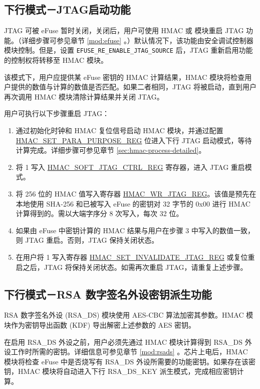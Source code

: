 \documentclass[main\_\_CN.tex]{subfiles}
\begin{document}
\subsection{下行模式－JTAG启动功能}

JTAG 可被 eFuse 暂时关闭，关闭后，用户可使用 HMAC 或 \textit{} 模块重启 JTAG 功能。（详细步骤可参见章节 \ref{mod:efuse} \textit{}。）默认情况下，该功能由安全调试控制器模块控制。但是，设置 \texttt{EFUSE\_RE\_ENABLE\_JTAG\_SOURCE} 后，JTAG 重新启用功能的控制权将转移至 HMAC 模块。

该模式下，用户应提供某 eFuse 密钥的 HMAC 计算结果，HMAC 模块将检查用户提供的数值与计算的数值是否匹配。如果二者相同，JTAG 将被启动，直到用户再次调用 HMAC 模块清除计算结果并关闭 JTAG。

用户可执行以下步骤重启 JTAG：

\begin{enumerate}
    \item 通过初始化时钟和 HMAC 复位信号启动 HMAC 模块，并通过配置 \hyperref[regdesc:HMACSETPARAPURPOSEREG]{HMAC\_SET\_PARA\_PURPOSE\_REG} 位进入下行 JTAG 启动模式，等待计算完成。详细步骤可参见章节 \ref{sec:hmac-process-detailed}。
    \item 将 1 写入 \hyperref[regdesc:HMACSOFTJTAGCTRLREG]{HMAC\_SOFT\_JTAG\_CTRL\_REG} 寄存器，进入 JTAG 重启模式。
    \item 将 256 位的 HMAC 值写入寄存器 \hyperref[regdesc:HMACWRJTAGREG]{HMAC\_WR\_JTAG\_REG}。该值是预先在本地使用 SHA-256 和已被写入 eFuse 的密钥对 32 字节的 0x00 进行 HMAC 计算得到的。需以大端字序分 8 次写入，每次 32 位。
    \item 如果由 eFuse 中密钥计算的 HMAC 结果与用户在步骤 3 中写入的数值一致，则 JTAG 重启。否则，JTAG 保持关闭状态。
    \item 在用户将 1 写入寄存器 \hyperref[regdesc:HMACSETINVALIDATEJTAGREG]{HMAC\_SET\_INVALIDATE\_JTAG\_REG} 或复位重启之后，JTAG 将保持关闭状态。如需再次重启 JTAG，请重复上述步骤。
    \end{enumerate}

\subsection{下行模式－RSA 数字签名外设密钥派生功能}

RSA 数字签名外设 (RSA\_DS) 模块使用 AES-CBC 算法加密其参数。HMAC 模块作为密钥导出函数 (KDF) 导出解密上述参数的 AES 密钥。

在启用 RSA\_DS 外设之前，用户必须先通过 HMAC 模块计算得到 RSA\_DS 外设工作时所需的密钥。详细信息可参见章节 \ref{mod:rsads} \textit{}。芯片上电后，HMAC 模块将检查 eFuse 中是否烧写有 RSA\_DS 外设所需要的功能密钥。如果存在该密钥，HMAC 模块将自动进入下行 RSA\_DS\_KEY 派生模式，完成相应密钥计算。
\end{document}
